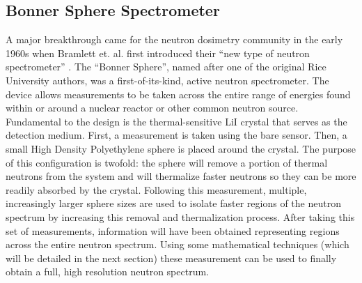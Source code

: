 \subsection{Bonner Sphere Spectrometer}
A major breakthrough came for the neutron dosimetry community in the early 1960s when Bramlett et. al. first introduced their ``new type of neutron spectrometer'' \cite{bramblett1960new}.
The ``Bonner Sphere'', named after one of the original Rice University authors, was a first-of-its-kind, active neutron spectrometer.
The device allows measurements to be taken across the entire range of energies found within or around a nuclear reactor or other common neutron source.
Fundamental to the design is the thermal-sensitive LiI crystal that serves as the detection medium.
First, a measurement is taken using the bare sensor.
Then, a small High Density Polyethylene sphere is placed around the crystal.
The purpose of this configuration is twofold: the sphere will remove a portion of thermal neutrons from the system and will thermalize faster neutrons so they can be more readily absorbed by the crystal.
Following this measurement, multiple, increasingly larger sphere sizes are used to isolate faster regions of the neutron spectrum by increasing this removal and thermalization process.
After taking this set of measurements, information will have been obtained representing regions across the entire neutron spectrum.
Using some mathematical techniques (which will be detailed in the next section) these measurement can be used to finally obtain a full, high resolution neutron spectrum.

